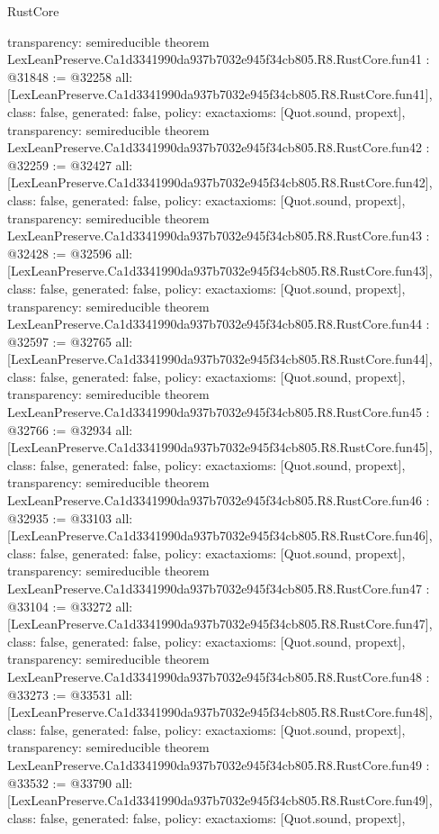 \begin{lexlean}{RustCore}
\begin{coremodule}
{  transparency: semireducible
}
theorem LexLeanPreserve.Ca1d3341990da937b7032e945f34cb805.R8.RustCore.fun41 : @31848 := @32258 {
  all: [LexLeanPreserve.Ca1d3341990da937b7032e945f34cb805.R8.RustCore.fun41],
  class: false,
  generated: false,
  policy: exact{axioms: [Quot.sound, propext]},
  transparency: semireducible
}
theorem LexLeanPreserve.Ca1d3341990da937b7032e945f34cb805.R8.RustCore.fun42 : @32259 := @32427 {
  all: [LexLeanPreserve.Ca1d3341990da937b7032e945f34cb805.R8.RustCore.fun42],
  class: false,
  generated: false,
  policy: exact{axioms: [Quot.sound, propext]},
  transparency: semireducible
}
theorem LexLeanPreserve.Ca1d3341990da937b7032e945f34cb805.R8.RustCore.fun43 : @32428 := @32596 {
  all: [LexLeanPreserve.Ca1d3341990da937b7032e945f34cb805.R8.RustCore.fun43],
  class: false,
  generated: false,
  policy: exact{axioms: [Quot.sound, propext]},
  transparency: semireducible
}
theorem LexLeanPreserve.Ca1d3341990da937b7032e945f34cb805.R8.RustCore.fun44 : @32597 := @32765 {
  all: [LexLeanPreserve.Ca1d3341990da937b7032e945f34cb805.R8.RustCore.fun44],
  class: false,
  generated: false,
  policy: exact{axioms: [Quot.sound, propext]},
  transparency: semireducible
}
theorem LexLeanPreserve.Ca1d3341990da937b7032e945f34cb805.R8.RustCore.fun45 : @32766 := @32934 {
  all: [LexLeanPreserve.Ca1d3341990da937b7032e945f34cb805.R8.RustCore.fun45],
  class: false,
  generated: false,
  policy: exact{axioms: [Quot.sound, propext]},
  transparency: semireducible
}
theorem LexLeanPreserve.Ca1d3341990da937b7032e945f34cb805.R8.RustCore.fun46 : @32935 := @33103 {
  all: [LexLeanPreserve.Ca1d3341990da937b7032e945f34cb805.R8.RustCore.fun46],
  class: false,
  generated: false,
  policy: exact{axioms: [Quot.sound, propext]},
  transparency: semireducible
}
theorem LexLeanPreserve.Ca1d3341990da937b7032e945f34cb805.R8.RustCore.fun47 : @33104 := @33272 {
  all: [LexLeanPreserve.Ca1d3341990da937b7032e945f34cb805.R8.RustCore.fun47],
  class: false,
  generated: false,
  policy: exact{axioms: [Quot.sound, propext]},
  transparency: semireducible
}
theorem LexLeanPreserve.Ca1d3341990da937b7032e945f34cb805.R8.RustCore.fun48 : @33273 := @33531 {
  all: [LexLeanPreserve.Ca1d3341990da937b7032e945f34cb805.R8.RustCore.fun48],
  class: false,
  generated: false,
  policy: exact{axioms: [Quot.sound, propext]},
  transparency: semireducible
}
theorem LexLeanPreserve.Ca1d3341990da937b7032e945f34cb805.R8.RustCore.fun49 : @33532 := @33790 {
  all: [LexLeanPreserve.Ca1d3341990da937b7032e945f34cb805.R8.RustCore.fun49],
  class: false,
  generated: false,
  policy: exact{axioms: [Quot.sound, propext]},
}
\end{coremodule}
\end{lexlean}

